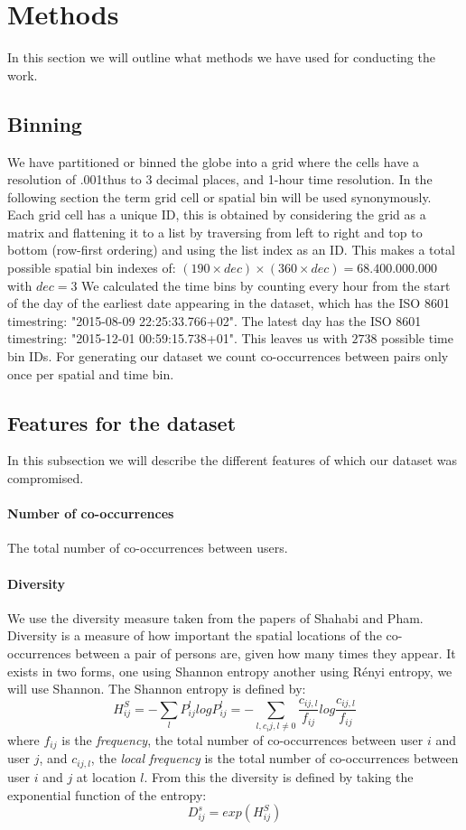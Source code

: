\section{Methods}
In this section we will outline what methods we have used for conducting the work.
\subsection{Binning}
We have partitioned or binned the globe into a grid where the cells have a resolution of .001\degree thus to 3 decimal places, and 1-hour time resolution. In the following section the term grid cell or spatial bin will be used synonymously. Each grid cell has a unique ID, this is obtained by considering the grid as a matrix and flattening it to a list by traversing from left to right and top to bottom (row-first ordering) and using the list index as an ID. This makes a total possible spatial bin indexes of: $(190\times dec)\times(360\times dec)=68.400.000.000$ with $dec=3$ We calculated the time bins by counting every hour from the start of the day of the earliest date appearing in the dataset, which has the ISO 8601 timestring: "2015-08-09 22:25:33.766+02". The latest day has the ISO 8601 timestring: "2015-12-01 00:59:15.738+01". This leaves us with $2738$ possible time bin IDs. For generating our dataset we count co-occurrences between pairs only once per spatial and time bin.

\subsection{Features for the dataset}
In this subsection we will describe the different features of which our dataset was compromised.
\paragraph{Number of co-occurrences}
The total number of co-occurrences between users.
\paragraph{Diversity}
We use the diversity measure taken from the papers of Shahabi and Pham\cite{iRWRfSD}\cite{AEBMtISSfSD}.
Diversity is a measure of how important the spatial locations of the co-occurrences between a pair of persons are, given how many times they appear.
It exists in two forms, one using Shannon entropy another using Rényi entropy, we will use Shannon.
The Shannon entropy is defined by:
$$ H^S_{ij}=-\sum\limits_{l}P^l_{ij}logP^l_{ij}= -\sum\limits_{l,c_ij,l\neq 0}\frac{c_{ij,l}}{f_{ij}}log\frac{c_{ij,l}}{f_{ij}}$$
where $f_{ij}$ is the \textit{frequency}, the total number of co-occurrences between user $i$ and user $j$, and $c_{ij,l}$, the \textit{local frequency} is the total number of co-occurrences between user $i$ and $j$ at location $l$.
From this the diversity is defined by taking the exponential function of the entropy:
$$ D^s_{ij} = exp(H^S_{ij})$$

